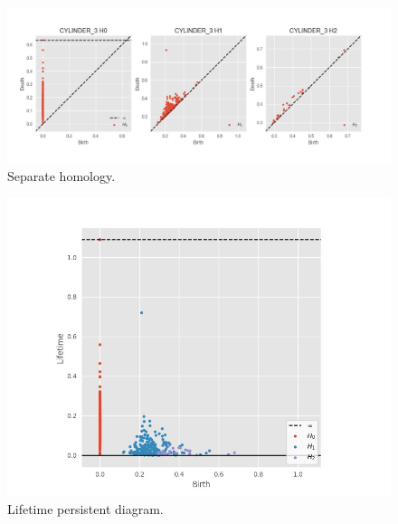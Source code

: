 \documentclass[11pt,a4paper]{report}
\begin{document}
              \begin{figure}[H]
                \centering
                \includegraphics[width=\linewidth]{./ripser/rand_cyclinder_per_homology_seperate.jpg}
                \caption{Separate homology.}
                \label{fig:sep hom}
              \end{figure}

              \begin{figure}[H]
                \centering
                \includegraphics[width=0.5\linewidth, scale=0.5]{./ripser/rand_cylinder_lifetime.jpg}
                \caption{Lifetime persistent diagram.}
                \label{fig:sep hom}
              \end{figure}







\end{document}
